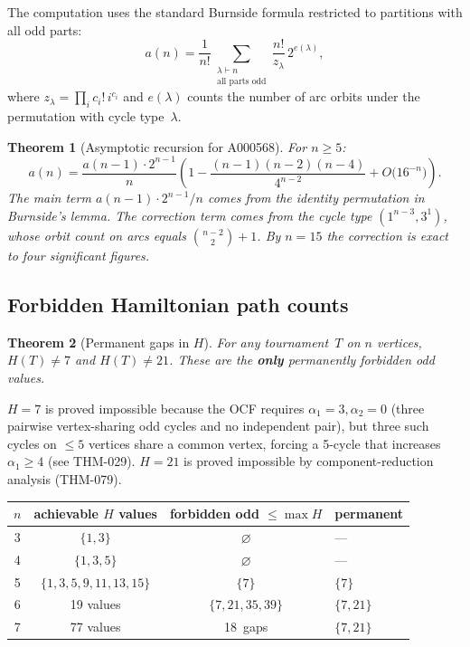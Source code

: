 \documentclass[12pt,reqno]{amsart}
\theoremstyle{plain}
\newtheorem{theorem}{Theorem}[section]
\theoremstyle{definition}
\theoremstyle{remark}
\begin{document}
\noindent The computation uses the standard Burnside formula restricted to partitions with all odd parts:
\[
  a(n) = \frac{1}{n!} \sum_{\substack{\lambda \vdash n \\ \text{all parts odd}}} \frac{n!}{z_\lambda}\,2^{e(\lambda)},
\]
where $z_\lambda = \prod_i c_i!\,i^{c_i}$ and $e(\lambda)$ counts the number of arc orbits under the permutation with cycle type~$\lambda$.

\begin{theorem}[Asymptotic recursion for A000568]\label{thm:a568_recursion}
For $n \geq 5$:
\[
  a(n) = \frac{a(n-1)\cdot 2^{n-1}}{n}\!\left(1 - \frac{(n{-}1)(n{-}2)(n{-}4)}{4^{n-2}} + O\bigl(16^{-n}\bigr)\right)\!.
\]
The main term $a(n{-}1)\cdot 2^{n-1}/n$ comes from the identity permutation in Burnside's lemma.
The correction term comes from the cycle type $(1^{n-3}, 3^1)$, whose orbit count on arcs equals $\binom{n-2}{2}+1$.
By $n = 15$ the correction is exact to four significant figures.
\end{theorem}

\subsection{Forbidden Hamiltonian path counts}

\begin{theorem}[Permanent gaps in $H$]\label{thm:permanent_gaps}
For any tournament~$T$ on $n$ vertices, $H(T) \neq 7$ and $H(T) \neq 21$.
These are the \textbf{only} permanently forbidden odd values.
\end{theorem}

\noindent $H = 7$ is proved impossible because the OCF requires $\alpha_1 = 3, \alpha_2 = 0$ (three pairwise vertex-sharing odd cycles and no independent pair), but three such cycles on $\leq 5$ vertices share a common vertex, forcing a 5-cycle that increases $\alpha_1 \geq 4$ (see THM-029).
$H = 21$ is proved impossible by component-reduction analysis (THM-079).

\begin{center}
\renewcommand{\arraystretch}{1.12}
\begin{tabular}{cccl}
\hline
$n$ & achievable $H$ values & forbidden odd $\leq \max H$ & permanent \\
\hline
3 & $\{1, 3\}$ & $\varnothing$ & --- \\
4 & $\{1, 3, 5\}$ & $\varnothing$ & --- \\
5 & $\{1, 3, 5, 9, 11, 13, 15\}$ & $\{7\}$ & $\{7\}$ \\
6 & 19 values & $\{7, 21, 35, 39\}$ & $\{7, 21\}$ \\
7 & 77 values & 18~gaps & $\{7, 21\}$ \\
\hline
\end{tabular}
\label{tab:h_gaps}
\end{center}
\end{document}
